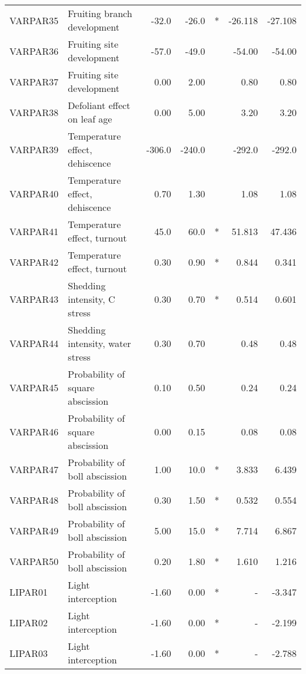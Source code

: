 \begin{longtable}{llrrcrr}
    VARPAR35  & Fruiting branch development      & -32.0  & -26.0  & *   & -26.118  & -27.108  \\
    VARPAR36  & Fruiting site development        & -57.0  & -49.0  &     & -54.00   & -54.00   \\
    VARPAR37  & Fruiting site development        & 0.00   & 2.00   &     & 0.80     & 0.80     \\
    VARPAR38  & Defoliant effect on leaf age     & 0.00   & 5.00   &     & 3.20     & 3.20     \\
    VARPAR39  & Temperature effect, dehiscence   & -306.0 & -240.0 &     & -292.0   & -292.0   \\
    VARPAR40  & Temperature effect, dehiscence   & 0.70   & 1.30   &     & 1.08     & 1.08     \\
    VARPAR41  & Temperature effect, turnout      & 45.0   & 60.0   & *   & 51.813   & 47.436   \\
    VARPAR42  & Temperature effect, turnout      & 0.30   & 0.90   & *   & 0.844    & 0.341    \\
    VARPAR43  & Shedding intensity, C stress     & 0.30   & 0.70   & *   & 0.514    & 0.601    \\
    VARPAR44  & Shedding intensity, water stress & 0.30   & 0.70   &     & 0.48     & 0.48     \\
    VARPAR45  & Probability of square abscission & 0.10   & 0.50   &     & 0.24     & 0.24     \\
    VARPAR46  & Probability of square abscission & 0.00   & 0.15   &     & 0.08     & 0.08     \\
    VARPAR47  & Probability of boll abscission   & 1.00   & 10.0   & *   & 3.833    & 6.439    \\
    VARPAR48  & Probability of boll abscission   & 0.30   & 1.50   & *   & 0.532    & 0.554    \\
    VARPAR49  & Probability of boll abscission   & 5.00   & 15.0   & *   & 7.714    & 6.867    \\
    VARPAR50  & Probability of boll abscission   & 0.20   & 1.80   & *   & 1.610    & 1.216    \\
    LIPAR01   & Light interception               & -1.60  & 0.00   & *   & -        & -3.347   \\
    LIPAR02   & Light interception               & -1.60  & 0.00   & *   & -        & -2.199   \\
    LIPAR03   & Light interception               & -1.60  & 0.00   & *   & -        & -2.788   \\

\end{longtable}
